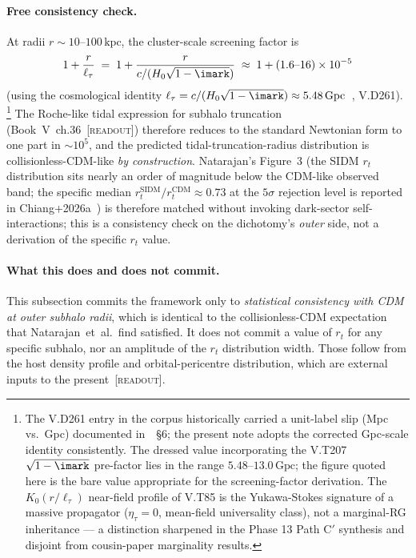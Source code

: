 \documentclass{pantarhei-researchnote}
\newcommand{\elltauv}{\ell_\tau}                %
\newcommand{\kpc}{\mathrm{kpc}}
\newcommand{\readout}{\textsc{[readout]}}
\begin{document}
\paragraph{Free consistency check.}
At radii $r \sim 10$--$100\,\kpc$, the cluster-scale screening factor is
\[
  1 + \frac{r}{\elltauv} \;=\; 1 + \frac{r}{c/(H_0 \sqrt{1 - \imark})}
  \;\approx\; 1 + (1.6\text{--}16)\times 10^{-5}
\]
(using the cosmological identity $\elltauv = c/(H_0\sqrt{1-\imark})
\approx 5.48\,\mathrm{Gpc}$~\cite{KSZCategorical}, V.D261).%
\footnote{The V.D261 entry in the corpus historically carried a unit-label
slip (Mpc vs.\ Gpc) documented in~\cite{KSZCategorical}~\S{}6; the present
note adopts the corrected Gpc-scale identity consistently. The dressed value
incorporating the V.T207 $\sqrt{1-\imark}$ pre-factor lies in the range
$5.48$--$13.0\,\mathrm{Gpc}$; the figure quoted here is the bare value
appropriate for the screening-factor derivation. The $K_0(r/\elltauv)$
near-field profile of V.T85 is the Yukawa-Stokes signature of a massive
propagator ($\eta_\tau = 0$, mean-field universality class), not a marginal-RG
inheritance --- a distinction sharpened in the Phase 13 Path C${}'$ synthesis
and disjoint from cousin-paper marginality results.}
The Roche-like tidal expression for subhalo truncation
(Book~V~ch.36~\readout) therefore reduces to the standard Newtonian form
to one part in $\sim 10^{5}$, and the predicted tidal-truncation-radius
distribution is collisionless-CDM-like \emph{by construction}.
Natarajan's Figure~3 (the SIDM $r_t$ distribution sits nearly an order of
magnitude below the CDM-like observed band; the specific median
$r_t^{\mathrm{SIDM}}/r_t^{\mathrm{CDM}} \approx 0.73$ at the $5\sigma$
rejection level is reported in Chiang+2026a~\cite{ChiangTNGC2026}) is
therefore matched without invoking dark-sector self-interactions; this
is a consistency check on the dichotomy's \emph{outer} side, not a
derivation of the specific $r_t$ value.

\paragraph{What this does and does not commit.}
This subsection commits the framework only to \emph{statistical
consistency with CDM at outer subhalo radii}, which is identical to the
collisionless-CDM expectation that Natarajan~et~al.\ find satisfied. It
does not commit a value of $r_t$ for any specific subhalo, nor an
amplitude of the $r_t$ distribution width. Those follow from the host
density profile and orbital-pericentre distribution, which are
external inputs to the present~\readout.
\end{document}
